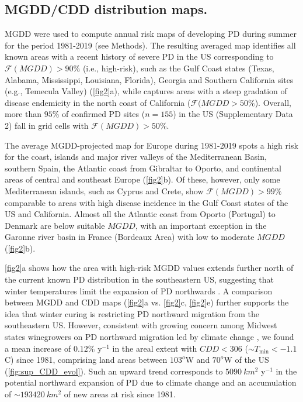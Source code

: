\subsection{MGDD/CDD distribution maps.} MGDD were used to compute annual risk
maps of developing PD during summer for the period 1981-2019 (see Methods).
The resulting averaged map identifies all known areas with a recent history of
severe PD in the US corresponding to $\mathcal{F}(MGDD) > 90\%$ (i.e.,
high-risk), such as the Gulf Coast states (Texas, Alabama, Mississippi,
Louisiana, Florida), Georgia and Southern California sites (e.g., Temecula
Valley) (\cref{fig2}a), while captures areas with a steep gradation of
disease endemicity in the north coast of California ($\mathcal{F}(MGDD >
    50\%$). Overall, more than $95\%$ of confirmed PD sites ($n = 155$) in the
    US
    (Supplementary Data 2) fall in grid cells with $\mathcal{F}(MGDD) > 50 \%$.

    The average MGDD-projected map for Europe during 1981-2019 spots a high
    risk
    for the coast, islands and major river valleys of the Mediterranean Basin,
    southern Spain, the Atlantic coast from Gibraltar to Oporto, and
    continental
    areas of central and southeast Europe (\cref{fig2}b). Of these, however,
    only
    some Mediterranean islands, such as Cyprus and Crete, show
$\mathcal{F}(MGDD) >
99\%$ comparable to areas with high disease incidence in the Gulf Coast states
    of the US and California. Almost all the Atlantic coast from Oporto
    (Portugal)
    to Denmark are below suitable $MGDD$, with an important exception in the
    Garonne river basin in France (Bordeaux Area) with low to moderate $MGDD$
    (\cref{fig2}b).

    \cref{fig2}a shows how the area with high-risk MGDD values extends further
    north of the current known PD distribution in the southeastern US,
    suggesting
    that winter temperatures limit the expansion of PD northwards
    \cite{Hopkins2002}. A comparison between MGDD and CDD maps (\cref{fig2}a
    vs.
    \cref{fig2}c, \cref{fig2}e) further supports the idea that winter curing is
    restricting PD northward migration from the southeastern US. However,
    consistent with growing concern among Midwest states winegrowers on PD
    northward migration led by climate change \cite{Galvez2010}, we found a
    mean
    increase of $0.12 \%$ y$^{-1}$ in the areal extent with $CDD < 306$ ($\sim
T_{\textrm{min}} < -1.1$ \textdegree C) since 1981, comprising land areas
    between $103^o$W and $70^o$W of the US (\cref{fig:sup_CDD_evol}). Such an
    upward
    trend corresponds to $\SI{5090}{km^2}$ y$^{-1}$ in the potential northward
    expansion of PD due to climate change and an accumulation of $\sim
\SI{193420}{km^2}$ of new areas at risk since 1981.

